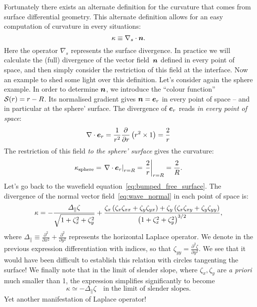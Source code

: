 Fortunately there exists an alternate definition for the curvature that comes from surface differential geometry. This alternate definition allows for an easy computation of curvature in every situations:
\begin{equation}
\kappa \equiv \nabla_s \cdot \bn.
\end{equation}
Here the operator $\nabla_s$ represents the surface divergence. In practice we will calculate the (full) divergence of the vector field~$\bn$ defined in every point of space, and then simply consider the restriction of this field at the interface. Now an example to shed some light over this definition.
 Let's consider again the sphere example. In order to determine $\bn$, we introduce the ``colour function'' $\mathcal S(r) = r - R$. Its normalised gradient gives $\bn = \be_r$ in every point of space -- and in particular at the sphere' surface. The divergence of $\be_r$ reads \textit{in every point of space}:
\begin{equation}
\nabla \cdot \be_r = \frac{1}{r^2} \pd{}{r} \lp r^2 \times 1 \rp = \frac{2}{r}
\end{equation}
The restriction of this field \textit{to the sphere' surface} gives the curvature:
\begin{equation}
\kappa_\text{sphere} = \left.\nabla \cdot \be_r\right|_{r=R} = \left.\frac{2}{r}\right|_{r=R} = \frac{2}{R}.
\end{equation}
 Let's go back to the wavefield equation~\eqref{eq:bumped_free_surface}. The divergence of the normal vector field~\eqref{eq:wave_normal} in each point of space is:
\begin{equation}
\kappa= -\frac{\Delta_\parallel \zeta}{\sqrt{1+\zeta_x^2+\zeta_y^2}} + \frac{\zeta_x\left(\zeta_x \zeta_{xx} + \zeta_y \zeta_{yx}\right) + \zeta_y\left(\zeta_x \zeta_{xy} + \zeta_y \zeta_{yy}\right)}{\left( 1+\zeta_x^2+\zeta_y^2\right)^{3/2}},
\end{equation}
where $\Delta_\parallel \equiv \frac{\partial^2}{\partial x^2} + \frac{\partial^2}{\partial y^2}$ represents the horizontal Laplace operator. We denote in the previous expression differentiation with indices, so that $ \zeta_{yy} = \frac{\partial^2\zeta}{\partial y^2}$. We see that it would have been difficult to establish this relation with circles tangenting the surface! We finally note that in the limit of slender slope, where $\zeta_x,\zeta_y$ are \textit{a priori} much smaller than 1, the expression simplifies significantly to become
\begin{equation}
\kappa \simeq - \Delta_\parallel \zeta \quad \text{in the limit of slender slopes}.
\end{equation}
Yet another manifestation of Laplace operator!
